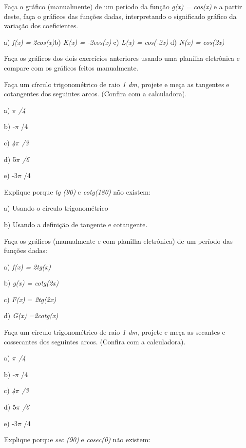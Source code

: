 \begin{exercicios}
\item Faça o gráfico (manualmente) de um período da função \textit{g(x) = cos(x) }e a partir deste, faça o gráficos das funções dadas, interpretando o significado gráfico da variação dos coeficientes.

a) \textit{f(x) = 2cos(x)\tab  }b) \textit{K(x) = -2cos(x) \tab }c)\textit{ L(x) = cos(-2x)  \tab }d) \textit{N(x) = cos(2x)}

\item Faça os gráficos dos dois exercícios anteriores usando uma planilha eletrônica e compare com os gráficos feitos manualmente.

\item Faça um círculo trigonométrico de raio \textit{1 dm}, projete e meça as tangentes e cotangentes dos seguintes arcos. (Confira com a calculadora).

a) \textit{$ \pi $ /4}

b) -$ \pi $ /4

c) \textit{4$ \pi $ /3}

d) 5\textit{$ \pi $ /6}

e) -3$ \pi $ /4

\item Explique porque \textit{tg (90\degree)} e \textit{cotg(180\degree)} não existem:

a) Usando o círculo trigonométrico

b) Usando a definição de tangente e cotangente.

\item Faça os gráficos (manualmente e com planilha eletrônica) de um período das funções dadas:

a) \textit{f(x) = 2tg(x)}

b) \textit{g(x) = cotg(2x)}

c) \textit{F(x) }= \textit{2tg(2x)}

d) \textit{G(x) =2cotg(x)}

\item Faça um círculo trigonométrico de raio \textit{1 dm}, projete e meça as secantes e cossecantes dos seguintes arcos. (Confira com a calculadora).

a)\textit{ $ \pi $ /4}

b) -$ \pi $ /4

c) \textit{4$ \pi $ /3}

d) 5\textit{$ \pi $ /6}

e) -3$ \pi $ /4

\item Explique porque \textit{sec (90\degree)} e \textit{cosec(0\degree)}     não existem:


\end{exercicios}
